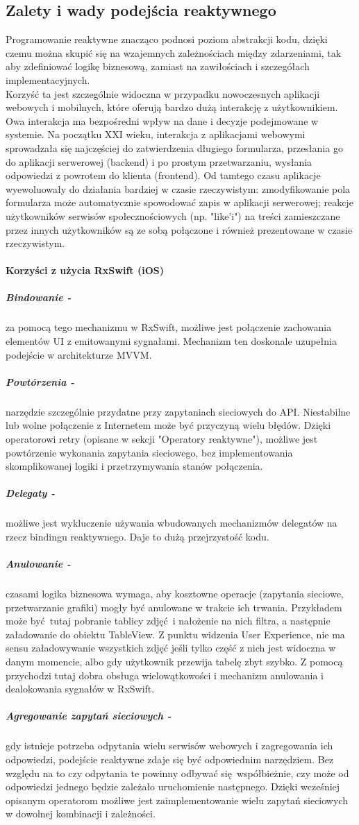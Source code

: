 \documentclass[12pt,oneside,a4paper]{report}
\begin{document}
\subsection{Zalety i wady podejścia reaktywnego} 
Programowanie reaktywne znacząco podnosi poziom abstrakcji kodu, dzięki czemu można skupić się na wzajemnych zależnościach między zdarzeniami, tak aby zdefiniować logikę biznesową, zamiast na zawiłościach i szczegółach implementacyjnych.\\
Korzyść ta jest szczególnie widoczna w przypadku nowoczesnych aplikacji webowych i mobilnych, które oferują bardzo dużą interakcję z użytkownikiem. Owa interakcja ma bezpośredni wpływ na dane i decyzje podejmowane w systemie. Na początku XXI wieku, interakcja z aplikacjami webowymi sprowadzała się najczęściej do zatwierdzenia długiego formularza, przesłania go do aplikacji serwerowej (backend) i po prostym przetwarzaniu, wysłania odpowiedzi z powrotem do klienta (frontend). Od tamtego czasu aplikacje wyewoluowały do działania bardziej w czasie rzeczywistym: zmodyfikowanie pola formularza może automatycznie spowodować zapis w aplikacji serwerowej; reakcje użytkowników serwisów społecznościowych (np. "like'i") na treści zamieszczane przez innych użytkowników są ze sobą połączone i również prezentowane w czasie rzeczywistym. 

\paragraph{Korzyści z użycia RxSwift (iOS)}
\subparagraph{Bindowanie -}za pomocą tego mechanizmu w RxSwift, możliwe jest połączenie zachowania elementów UI z emitowanymi sygnałami. Mechanizm ten doskonale uzupełnia podejście w architekturze MVVM. 
\subparagraph{Powtórzenia -}narzędzie szczególnie przydatne przy zapytaniach sieciowych do API. Niestabilne lub wolne połączenie z Internetem może być przyczyną wielu błędów. Dzięki operatorowi retry (opisane w sekcji "Operatory reaktywne"), możliwe jest powtórzenie wykonania zapytania sieciowego, bez implementowania skomplikowanej logiki i przetrzymywania stanów połączenia.
\subparagraph{Delegaty -}możliwe jest wykluczenie używania wbudowanych mechanizmów delegatów na rzecz bindingu reaktywnego. Daje to dużą przejrzystość kodu. 
\subparagraph{Anulowanie -}czasami logika biznesowa wymaga, aby kosztowne operacje (zapytania sieciowe, przetwarzanie grafiki) mogły być anulowane w trakcie ich trwania. Przykładem może być tutaj pobranie tablicy zdjęć i nałożenie na nich filtra, a następnie załadowanie do obiektu TableView. Z punktu widzenia User Experience, nie ma sensu załadowywanie wszystkich zdjęć jeśli tylko część z nich jest widoczna w danym momencie, albo gdy użytkownik przewija tabelę zbyt szybko. Z pomocą przychodzi tutaj dobra obsługa wielowątkowości i mechanizm anulowania i dealokowania sygnałów w RxSwift.
\subparagraph{Agregowanie zapytań sieciowych -}gdy istnieje potrzeba odpytania wielu serwisów webowych i zagregowania ich odpowiedzi, podejście reaktywne zdaje się być odpowiednim narzędziem. Bez względu na to czy odpytania te powinny odbywać się współbieżnie, czy może od odpowiedzi jednego będzie zależało uruchomienie następnego. Dzięki wcześniej opisanym operatorom możliwe jest zaimplementowanie wielu zapytań sieciowych w dowolnej kombinacji i zależności. 
\end{document}
